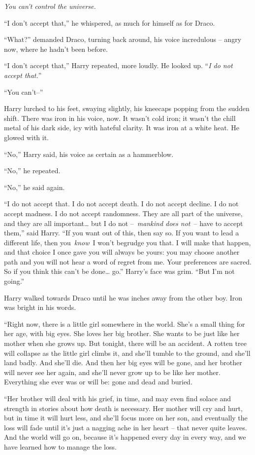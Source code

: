 \emph{You can't control the universe.}

``I don't accept that,'' he whispered, as much for himself as for Draco.

``What?'' demanded Draco, turning back around, his voice incredulous --
angry now, where he hadn't been before.

``I don't accept that,'' Harry repeated, more loudly. He looked up.
``\emph{I do not accept that.}''

``You can't--''

Harry lurched to his feet, swaying slightly, his kneecaps popping from
the sudden shift. There was iron in his voice, now. It wasn't cold iron;
it wasn't the chill metal of his dark side, icy with hateful clarity. It
was iron at a white heat. He glowed with it.

``No,'' Harry said, his voice as certain as a hammerblow.

``No,'' he repeated.

``No,'' he said again.

``I do not accept that. I do not accept death. I do not accept decline.
I do not accept madness. I do not accept randomness. They are all part
of the universe, and they are all important\ldots{} but I do not
--~\emph{mankind does not}~-- have to accept them,'' said Harry. ``If
you want out of this, then say so. If you want to lead a different life,
then you~\emph{know}~I won't begrudge you that. I will make that happen,
and that choice I once gave you will always be yours: you may choose
another path and you will not hear a word of regret from me. Your
preferences are sacred. So if you think this can't be done\ldots{} go.''
Harry's face was grim. ``But I'm not going.''

Harry walked towards Draco until he was inches away from the other boy.
Iron was bright in his words.

``Right now, there is a little girl somewhere in the world. She's a
small thing for her age, with big eyes. She loves her big brother. She
wants to be just like her mother when she grows up. But tonight, there
will be an accident. A rotten tree will collapse as the little girl
climbs it, and she'll tumble to the ground, and she'll land badly. And
she'll die. And then her big eyes will be gone, and her brother will
never see her again, and she'll never grow up to be like her mother.
Everything she ever was or will be: gone and dead and buried.

``Her brother will deal with his grief, in time, and may even find
solace and strength in stories about how death is necessary. Her mother
will cry and hurt, but in time it will hurt less, and she'll focus more
on her son, and eventually the loss will fade until it's just a nagging
ache in her heart -- that never quite leaves. And the world will go on,
because it's happened every day in every way, and we have learned how to
manage the loss.

